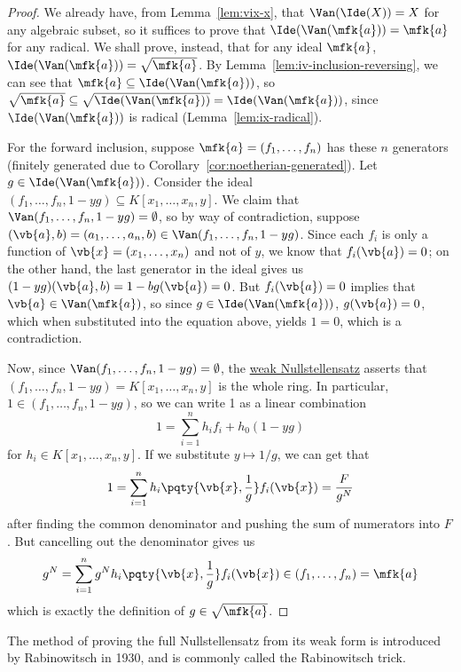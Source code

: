 \begin{proof}
    We already have, from Lemma~\ref{lem:vix-x}, that \(\Van(\Ide(X)) = X\) for any algebraic subset,
    so it suffices to prove that \(\Ide(\Van(\mfk{a})) = \mfk{a}\) for any radical.
    We shall prove, instead, that for any ideal \(\mfk{a}\),
    \(\Ide(\Van(\mfk{a})) = \sqrt{\mfk{a}}\).
    By Lemma~\ref{lem:iv-inclusion-reversing},
    we can see that \(\mfk{a} \subseteq \Ide(\Van(\mfk{a}))\),
    so \(\sqrt{\mfk{a}} \subseteq \sqrt{\Ide(\Van(\mfk{a}))} = \Ide(\Van(\mfk{a}))\),
    since \(\Ide(\Van(\mfk{a}))\) is radical (Lemma~\ref{lem:ix-radical}).

    For the forward inclusion,
    suppose \(\mfk{a} = (f_1,\hdots,f_n)\) has these \(n\) generators
    (finitely generated due to Corollary~\ref{cor:noetherian-generated}).
    Let \(g \in \Ide(\Van(\mfk{a}))\).
    Consider the ideal \((f_1,\hdots,f_n,1-yg) \subseteq K[x_1,\hdots,x_n,y]\).
    We claim that \(\Van(f_1,\hdots,f_n,1-yg) = \emptyset\),
    so by way of contradiction, suppose \((\vb{a},b) = (a_1,\hdots,a_n,b) \in \Van(f_1,\hdots,f_n,1-yg)\).
    Since each \(f_i\) is only a function of \(\vb{x} = (x_1,\hdots,x_n)\) and not of \(y\),
    we know that \(f_i(\vb{a}) = 0\);
    on the other hand, the last generator in the ideal gives us
    \((1-yg)(\vb{a},b) = 1 - bg(\vb{a}) = 0\).
    But \(f_i(\vb{a}) = 0\) implies that \(\vb{a} \in \Van(\mfk{a})\),
    so since \(g \in \Ide(\Van(\mfk{a}))\), \(g(\vb{a}) = 0\),
    which when substituted into the equation above, yields \(1 = 0\), which is a contradiction.

    Now, since \(\Van(f_1,\hdots,f_n,1-yg) = \emptyset\),
    the \hyperref[lem:weak-nullstellensatz]{weak Nullstellensatz}
    asserts that \((f_1,\hdots,f_n,1-yg) = K[x_1,\hdots,x_n,y]\) is the whole ring.
    In particular, \(1 \in (f_1,\hdots,f_n,1-yg)\),
    so we can write 1 as a linear combination
    \begin{equation*}
        1 = \sum_{i=1}^n h_i f_i + h_0(1-yg)
    \end{equation*}
    for \(h_i \in K[x_1,\hdots,x_n,y]\).
    If we substitute \(y \mapsto 1/g\), we can get that
    \begin{equation*}
        1 = \sum_{i=1}^n h_i\pqty{\vb{x},\frac{1}{g}}f_i(\vb{x}) = \frac{F}{g^N}
    \end{equation*}
    after finding the common denominator and pushing the sum of numerators into \(F\).
    But cancelling out the denominator gives us
    \begin{equation*}
        g^N = \sum_{i=1}^n g^N h_i\pqty{\vb{x},\frac{1}{g}}f_i(\vb{x})
        \in (f_1,\hdots,f_n) = \mfk{a}
    \end{equation*}
    which is exactly the definition of \(g \in \sqrt{\mfk{a}}\).
\end{proof}
\begin{remark}
    The method of proving the full Nullstellensatz from its weak form
    is introduced by Rabinowitsch in 1930,
    and is commonly called the Rabinowitsch trick.
\end{remark}

